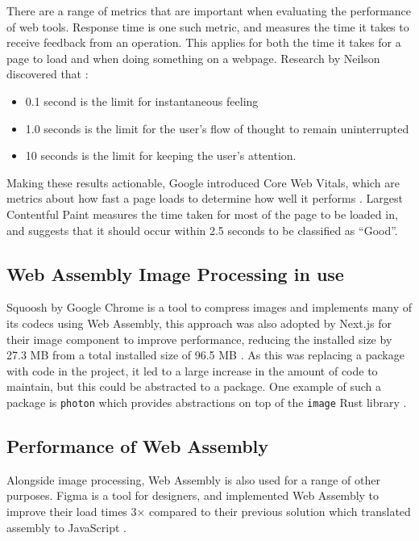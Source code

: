 \documentclass[12pt,a4paper]{article}
\begin{document}
There are a range of metrics that are important when evaluating the performance of web tools. Response time is one such metric, and measures the time it takes to receive feedback from an operation. This applies for both the time it takes for a page to load and when doing something on a webpage. Research by Neilson discovered that \cite{nielsen1994usability}:
\begin{itemize}
    \item 0.1 second is the limit for instantaneous feeling
    \item 1.0 seconds is the limit for the user's flow of thought to remain uninterrupted
    \item 10 seconds is the limit for keeping the user's attention.
\end{itemize}

Making these results actionable, Google introduced Core Web Vitals, which are metrics about how fast a page loads to determine how well it performs \cite{webvitals}. Largest Contentful Paint measures the time taken for most of the page to be loaded in, and suggests that it should occur within 2.5 seconds to be classified as “Good”.

\color{black}



\subsection{Web Assembly Image Processing in use}

Squoosh by Google Chrome is a tool to compress images and implements many of its codecs using Web Assembly, this approach was also adopted by Next.js for their image component to improve performance, reducing the installed size by 27.3 MB from a total installed size of 96.5 MB \cite{nextjs}. As this was replacing a package with code in the project, it led to a large increase in the amount of code to maintain, but this could be abstracted to a package. One example of such a package is \texttt{photon} which provides abstractions on top of the \texttt{image} Rust library \cite{photon}.




\subsection{Performance of Web Assembly}

Alongside image processing, Web Assembly is also used for a range of other purposes. Figma is a tool for designers, and implemented Web Assembly to improve their load times 3$\times$ compared to their previous solution which translated assembly to JavaScript \cite{figmawasm}.
\end{document}
